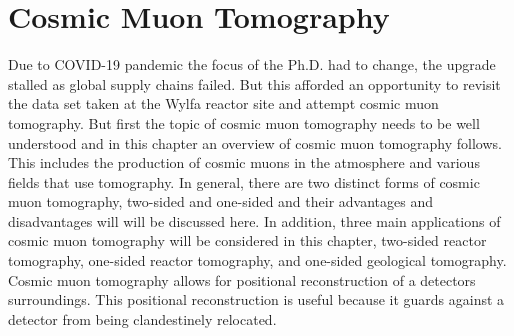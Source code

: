 
\chapter{Cosmic Muon Tomography}\label{chp:cosmicMuTelescopes}

\ifpdf
    \graphicspath{{Chapter5/Figs/Raster/}{Chapter5/Figs/PDF/}{Chapter5/Figs/}}
\else
    \graphicspath{{Chapter5/Figs/Vector/}{Chapter5/Figs/}}
\fi



Due to COVID-19 pandemic the focus of the Ph.D. had to change, the upgrade stalled as global supply chains failed. But this afforded an opportunity to revisit the  data set taken at the Wylfa reactor site and attempt cosmic muon tomography. But first the topic of cosmic muon tomography needs to be well understood and in this chapter an overview of cosmic muon tomography follows. This includes the production of cosmic muons in the atmosphere and various fields that use tomography. In general, there are two distinct forms of cosmic muon tomography, two-sided and one-sided and their advantages and disadvantages will will be discussed here. In addition, three main applications of cosmic muon tomography will be considered in this chapter, two-sided reactor tomography, one-sided reactor tomography, and one-sided geological tomography. Cosmic muon tomography allows for positional reconstruction of a detectors surroundings. This positional reconstruction is useful because it guards against a detector from being clandestinely relocated. 


